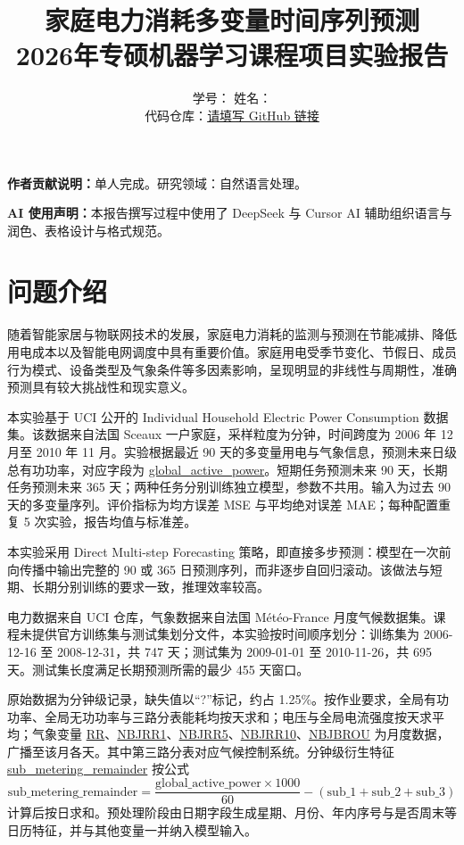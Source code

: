 \documentclass[UTF8,a4paper,12pt]{ctexart}
\title{\textbf{家庭电力消耗多变量时间序列预测} \\[0.5em]
\large 2026年专硕机器学习课程项目实验报告}
\author{%
学号：{\underline{\makebox[5cm][c]{20255227075}}} \quad
姓名：{\underline{\makebox[3cm][c]{刘通}}} \\[0.8em]
代码仓库：\url{请填写 GitHub 链接}%
}
\date{}
\newcommand{\varname}[1]{\url{#1}}
\begin{document}
\maketitle
\thispagestyle{empty}
\vspace{1em}
\noindent\textbf{作者贡献说明：}单人完成。研究领域：自然语言处理。

\vspace{0.5em}
\noindent\textbf{AI 使用声明：}本报告撰写过程中使用了 DeepSeek 与 Cursor AI 辅助组织语言与润色、表格设计与格式规范。
\newpage
\setcounter{page}{1}

\section{问题介绍}

随着智能家居与物联网技术的发展，家庭电力消耗的监测与预测在节能减排、降低用电成本以及智能电网调度中具有重要价值。家庭用电受季节变化、节假日、成员行为模式、设备类型及气象条件等多因素影响，呈现明显的非线性与周期性，准确预测具有较大挑战性和现实意义。

本实验基于 UCI 公开的 Individual Household Electric Power Consumption 数据集\cite{uci}。该数据来自法国 Sceaux 一户家庭，采样粒度为分钟，时间跨度为 2006 年 12 月至 2010 年 11 月。实验根据最近 90 天的多变量用电与气象信息，预测未来日级总有功功率，对应字段为 \varname{global_active_power}。短期任务预测未来 90 天，长期任务预测未来 365 天；两种任务分别训练独立模型，参数不共用。输入为过去 90 天的多变量序列。评价指标为均方误差 MSE 与平均绝对误差 MAE；每种配置重复 5 次实验，报告均值与标准差。

本实验采用 Direct Multi-step Forecasting 策略，即直接多步预测：模型在一次前向传播中输出完整的 90 或 365 日预测序列，而非逐步自回归滚动。该做法与短期、长期分别训练的要求一致，推理效率较高。

电力数据来自 UCI 仓库\cite{uci}，气象数据来自法国 Météo-France 月度气候数据集\cite{meteo}。课程未提供官方训练集与测试集划分文件，本实验按时间顺序划分：训练集为 2006-12-16 至 2008-12-31，共 747 天；测试集为 2009-01-01 至 2010-11-26，共 695 天。测试集长度满足长期预测所需的最少 455 天窗口。

原始数据为分钟级记录，缺失值以“?”标记，约占 1.25\%。按作业要求，全局有功功率、全局无功功率与三路分表能耗均按天求和；电压与全局电流强度按天求平均；气象变量 \varname{RR}、\varname{NBJRR1}、\varname{NBJRR5}、\varname{NBJRR10}、\varname{NBJBROU} 为月度数据，广播至该月各天。其中第三路分表对应气候控制系统。分钟级衍生特征 \varname{sub_metering_remainder} 按公式
\begin{equation}
\text{sub\_metering\_remainder} = \frac{\text{global\_active\_power} \times 1000}{60} - (\text{sub\_1} + \text{sub\_2} + \text{sub\_3})
\end{equation}
计算后按日求和。预处理阶段由日期字段生成星期、月份、年内序号与是否周末等日历特征，并与其他变量一并纳入模型输入。
\end{document}
